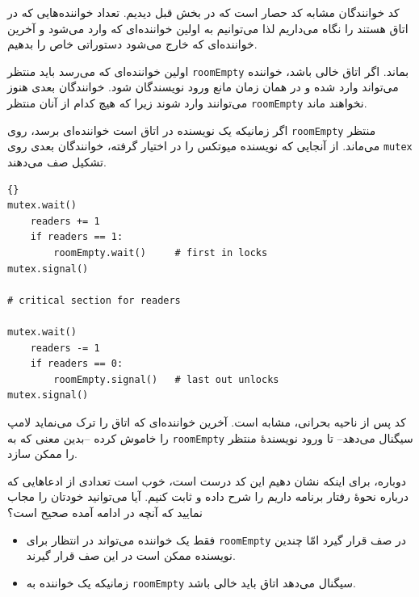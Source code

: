 \documentclass{book}
\begin{document}
    کد خوانندگان مشابه کد حصار است که در بخش قبل دیدیم. تعداد خواننده‌هایی که در اتاق هستند را نگاه می‌داریم لذا می‌توانیم به 
    اولین خواننده‌ای که وارد می‌شود و آخرین خواننده‌ای که خارج می‌شود دستوراتی خاص را بدهیم. 

    اولین خواننده‌ای که می‌رسد باید منتظر  {\tt roomEmpty} بماند. اگر اتاق خالی باشد،‌ خواننده می‌تواند وارد شده و در همان زمان 
    مانع ورود نویسندگان شود. خوانندگان بعدی هنوز می‌توانند وارد شوند زیرا که هیچ کدام از آنان منتظر  {\tt roomEmpty} نخواهند ماند. 

    اگر زمانیکه یک نویسنده در اتاق است خواننده‌ای برسد، روی {\tt roomEmpty} منتظر می‌ماند. از آنجایی که نویسنده 
    میوتکس را در اختیار گرفته، خوانندگان بعدی روی  {\tt mutex} تشکیل صف می‌دهند. 
\begin{latin}
\begin{lstlisting}[title=\rl{راه‌حل خوانندگان}]{}
mutex.wait()
    readers += 1
    if readers == 1:
        roomEmpty.wait()     # first in locks
mutex.signal()

# critical section for readers

mutex.wait()
    readers -= 1
    if readers == 0:
        roomEmpty.signal()   # last out unlocks
mutex.signal()
\end{lstlisting}
\end{latin}

    کد پس از ناحیه بحرانی، مشابه است. آخرین خواننده‌ای که اتاق را ترک می‌نماید لامپ را خاموش کرده --بدین معنی که به {\tt roomEmpty}
    سیگنال می‌دهد-- تا ورود نویسندهٔ منتظر را ممکن سازد. 

    دوباره، برای اینکه نشان دهیم این کد درست است، خوب است 
    تعدادی از ادعاهایی که درباره نحوهٔ رفتار برنامه داریم را شرح داده و ثابت کنیم. 
    آیا می‌توانید خودتان را مجاب نمایید که آنچه در ادامه آمده صحیح است؟

\begin{itemize}

\item 
    فقط یک خواننده می‌تواند در انتظار برای {\tt roomEmpty} در صف قرار گیرد امّا چندین نویسنده ممکن است در این صف قرار گیرند. 

\item 
    زمانیکه یک خواننده به {\tt roomEmpty} سیگنال می‌دهد اتاق باید خالی باشد. 
\end{itemize}


\end{document}
